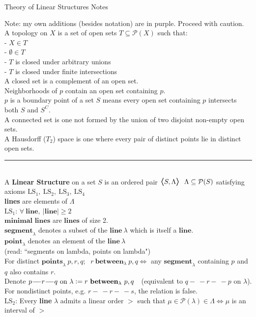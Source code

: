 \documentclass{article}
\newcommand{\hsp}[1][5]{\hspace{0.#1 cm}}
\newcommand{\bra}[1][1.2]{\scalebox{#1}{$\boldsymbol{\langle}$}}
\newcommand{\nl}[1][12]{\\[#1pt]}
\newcommand{\ket}[1][1.2]{\scalebox{#1}{$\boldsymbol{\rangle}$}}
\newcommand{\defeq}{\vcentcolon=}
\newcommand{\ch}[1]{\text{#1}}
\newcommand {\chb}[1]{\textbf{#1}}
\newcommand{\seg}{\!-\!\!\!\!\:-}
\begin{document}
\begin{center}
Theory of Linear Structures Notes
\end{center}
\begin{flushleft}
\hangindent=1.1cm 
Note: my own additions (besides notation) are in {\color{purple} purple}. Proceed with caution.\nl[6]
A topology on $X$ is a set of open sets $T\subseteq \mathcal{P}(X)$ such that:\nl[6]
 - $X \in T$\\
 - $\emptyset \in T$\\
 - $T$ is closed under arbitrary unions\\
 - $T$ is closed under finite intersections\nl[6]
A closed set is a complement of an open set.\\
Neighborhoods of $p$ contain an open set containing $p$.\\
$p$ is a boundary point of a set $S$ means every open set containing $p$ intersects both $S$ and $S^C$.\\
A connected set is one not formed by the union of two disjoint non-empty open sets.\\
A Hausdorff ($T_2$) space is one where every pair of distinct points lie in distinct open sets.\nl[7]
\par\noindent\rule{\textwidth}{0.4pt}\nl[5]
A \chb{Linear Structure} on a set $S$ is an ordered pair $\bra S, \Lambda \ket\ \ \Lambda \subseteq \mathcal{P}(S)$ satisfying axioms $\ch{LS}_1,\ \ch{LS}_2,\ \ch{LS}_3,\ \ch{LS}_4$\nl[6]
\hsp[2]\textbf{lines} are elements of $\Lambda$\nl[12]

$\ch{LS}_1$: $\forall\ \chb{line},\  |\chb{line}|\geq 2$\nl[6]\hsp[2]
$\chb{minimal lines}$ are $\chb{lines}$ of size 2.\\\hsp[2]
$\chb{segment}_\lambda$ denotes a subset of the $\chb{line}\ \lambda$ which is itself a $\chb{line}$.\\\hsp[2]
$\chb{point}_\lambda$ denotes an element of the $\chb{line}\ \lambda $\\\hsp[2]
(read: ``segments on lambda, points on lambda")\nl[6]
\hsp[2] For distinct $\chb{points}_\lambda\ p,r,q$; $\ \ r\  \chb{between}_\lambda\ p,q \iff$ any $\chb{segment}_\lambda$ containing $p$ and $q$ also contains $r$.\\
\hsp[2] Denote $p \seg r \seg q \ch{ on }\lambda \defeq r\ \chb{between}_\lambda\ p,q\ \ $ (equivalent to $q \seg r \seg p$ on $\lambda$).\\
\hsp[2] For nondistinct points, e.g. $r\seg r\seg s$, the relation is false.\nl[12]

$\ch{LS}_2$: Every \chb{line} $\lambda$ admits a linear order $>$ such that $\mu \in \mathcal{P}(\lambda) \in \Lambda \iff \mu$ is an interval of $>$\nl[5]


\end{flushleft}
\end{document}
